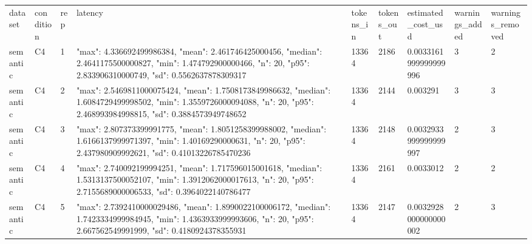 \begin{tabular}{lllllllll}
dataset & condition & rep & latency & tokens\_in & tokens\_out & estimated\_cost\_usd & warnings\_added & warnings\_removed \\
semantic & C4 & 1 & {"max": 4.336692499986384, "mean": 2.461746425000456, "median": 2.4641175500000827, "min": 1.474792900000466, "n": 20, "p95": 2.833906310000749, "sd": 0.5562637878309317} & 13364 & 2186 & 0.0033161999999999996 & 3 & 2 \\
semantic & C4 & 2 & {"max": 2.5469811000075424, "mean": 1.7508173849986632, "median": 1.6084729499998502, "min": 1.3559726000094088, "n": 20, "p95": 2.468993984998815, "sd": 0.3884573949748652} & 13364 & 2144 & 0.003291 & 3 & 3 \\
semantic & C4 & 3 & {"max": 2.807373399991775, "mean": 1.8051258399988002, "median": 1.6166137999971397, "min": 1.40169290000631, "n": 20, "p95": 2.437980909992621, "sd": 0.41013226785470236} & 13364 & 2148 & 0.0032933999999999997 & 2 & 3 \\
semantic & C4 & 4 & {"max": 2.740092199994251, "mean": 1.717596015001618, "median": 1.5313137500052107, "min": 1.3912062000017613, "n": 20, "p95": 2.7155689000006533, "sd": 0.3964022140786477} & 13364 & 2161 & 0.0033012 & 2 & 2 \\
semantic & C4 & 5 & {"max": 2.7392410000029486, "mean": 1.8990022100006172, "median": 1.7423334999984945, "min": 1.4363933999993606, "n": 20, "p95": 2.667562549991999, "sd": 0.4180924378355931} & 13364 & 2147 & 0.0032928000000000002 & 2 & 3 \\
\end{tabular}